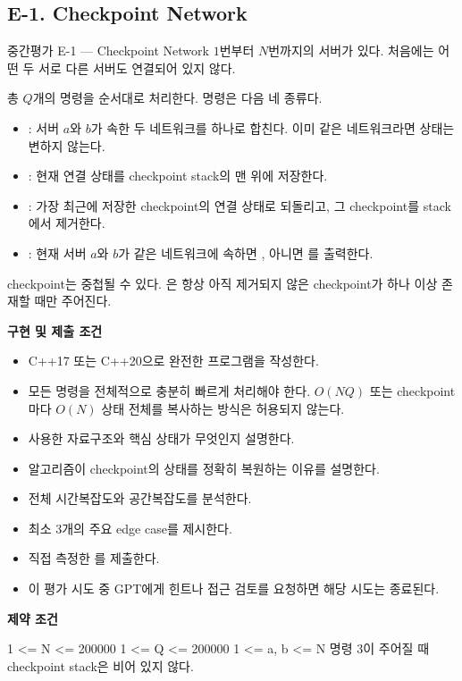 \subsection{E-1. Checkpoint Network}
\begin{problembox}{중간평가 E-1 --- Checkpoint Network}
$1$번부터 $N$번까지의 서버가 있다. 처음에는 어떤 두 서로 다른 서버도 연결되어 있지 않다.

총 $Q$개의 명령을 순서대로 처리한다. 명령은 다음 네 종류다.
\begin{itemize}
\item {}: 서버 $a$와 $b$가 속한 두 네트워크를 하나로 합친다. 이미 같은 네트워크라면 상태는 변하지 않는다.
\item {}: 현재 연결 상태를 checkpoint stack의 맨 위에 저장한다.
\item {}: 가장 최근에 저장한 checkpoint의 연결 상태로 되돌리고, 그 checkpoint를 stack에서 제거한다.
\item {}: 현재 서버 $a$와 $b$가 같은 네트워크에 속하면 , 아니면 를 출력한다.
\end{itemize}

checkpoint는 중첩될 수 있다. 은 항상 아직 제거되지 않은 checkpoint가 하나 이상 존재할 때만 주어진다.

\textbf{구현 및 제출 조건}
\begin{itemize}
\item C++17 또는 C++20으로 완전한 프로그램을 작성한다.
\item 모든 명령을 전체적으로 충분히 빠르게 처리해야 한다. $O(NQ)$ 또는 checkpoint마다 $O(N)$ 상태 전체를 복사하는 방식은 허용되지 않는다.
\item 사용한 자료구조와 핵심 상태가 무엇인지 설명한다.
\item 알고리즘이 checkpoint의 상태를 정확히 복원하는 이유를 설명한다.
\item 전체 시간복잡도와 공간복잡도를 분석한다.
\item 최소 3개의 주요 edge case를 제시한다.
\item 직접 측정한 를 제출한다.
\item 이 평가 시도 중 GPT에게 힌트나 접근 검토를 요청하면 해당 시도는 종료된다.
\end{itemize}

\textbf{제약 조건}
\begin{TextBlock}
1 <= N <= 200000
1 <= Q <= 200000
1 <= a, b <= N
명령 3이 주어질 때 checkpoint stack은 비어 있지 않다.
\end{TextBlock}


\end{problembox}
